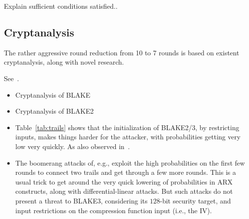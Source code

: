 \documentclass[11pt,notitlepage,a4paper]{article}
\begin{document}
Explain sufficient conditions satisfied..

\subsection{Cryptanalysis}\label{sec:cryptanalysis}

The rather aggressive round reduction from 10 to 7 rounds is based on existent cryptanalysis, along with novel research.

See~\cite{TMC}.

\begin{itemize}
  \item Cryptanalysis of BLAKE~\cite{DBLP:conf/cans/SuWWD10,DBLP:journals/ipl/VidaliNP10,DBLP:journals/iet-ifs/BaiYWW15,DBLP:conf/fse/AumassonGKMM10,DBLP:journals/iacr/JiL09,DK11,DBLP:conf/fse/BiryukovNR11}
  \item Cryptanalysis of BLAKE2~\cite{DBLP:conf/ctrsa/0001KNWW14,DBLP:conf/cisc/Hao14,DBLP:conf/crypto/EspitauFK15}
  \item Table~\ref{tab:trails} shows that the initialization of BLAKE2/3, by restricting inputs, makes things harder for the attacker, with probabilities getting very low very quickly. As also observed in~\cite[\S7]{DBLP:conf/ctrsa/0001KNWW14}. 
  \item The boomerang attacks of, e.g., \cite{DBLP:conf/cisc/Hao14,DBLP:conf/fse/BiryukovNR11,DBLP:journals/iet-ifs/BaiYWW15} exploit the high probabilities on the first few rounds to connect two trails and get through a few more rounds. This is a usual trick to get around the very quick lowering of probabilities in ARX constructs, along with differential-linear attacks. But such attacks do not present a threat to BLAKE3, considering its $128$-bit security target, and input restrictions on the compression function input (i.e., the IV).
\end{itemize}
\end{document}
